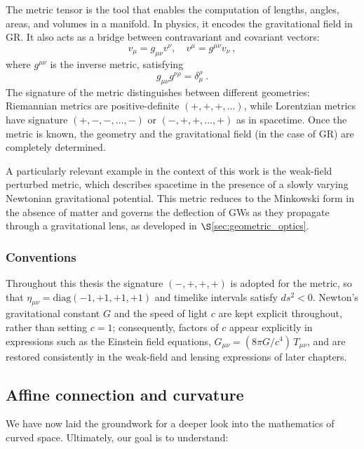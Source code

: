 The metric tensor is the tool that enables the computation of lengths, angles, areas, and volumes in a manifold. In physics, it encodes the gravitational field in GR. It also acts as a bridge between contravariant and covariant vectors:
\begin{equation}
v_\mu = g_{\mu\nu} v^\nu, \quad v^\mu = g^{\mu\nu} v_\nu \ ,
\end{equation}
where $g^{\mu\nu}$ is the inverse metric, satisfying
\begin{equation}
g_{\mu\nu} g^{\nu\rho} = \delta_\mu^\rho \ .
\end{equation}
The signature of the metric distinguishes between different geometries: Riemannian metrics are positive-definite $(+,+,+,\dots)$, while Lorentzian metrics have signature $(+,-,-,\dots,-)$ or $(-,+,+,\dots,+)$ as in spacetime. Once the metric is known, the geometry and the gravitational field (in the case of GR) are completely determined.

A particularly relevant example in the context of this work is the weak-field perturbed metric, which describes spacetime in the presence of a slowly varying Newtonian gravitational potential. This metric reduces to the Minkowski form in the absence of matter and governs 
the deflection of GWs as they propagate through a gravitational lens, as developed in $\S$\ref{sec:geometric_optics}.

\subsubsection{Conventions} 

Throughout this thesis the signature $(-,+,+,+)$ is adopted for the metric, so that $\eta_{\mu\nu} = \mathrm{diag}(-1,+1,+1,+1)$ and timelike intervals satisfy $ds^2 < 0$. Newton's gravitational constant $G$ and the speed of light $c$ are kept explicit throughout, rather than setting $c=1$; consequently, factors of $c$ appear explicitly in expressions such as the Einstein field equations, $G_{\mu\nu} = (8\pi G/c^4)\, T_{\mu\nu}$, and are restored consistently in the weak-field and lensing expressions of later chapters.




\subsection{Affine connection and curvature}

We have now laid the groundwork for a deeper look into the mathematics of curved space. Ultimately, our goal is to understand:

